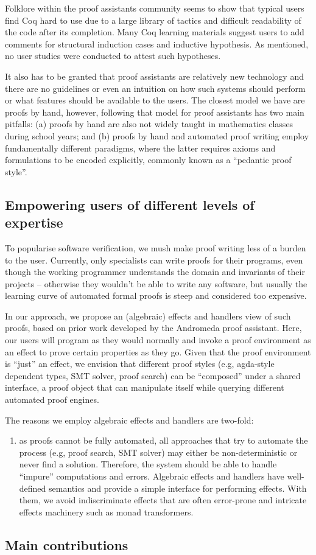 \documentclass[acmsmall]{acmart}
\begin{document}
Folklore within the proof assistants community seems to show that typical users
find Coq hard to use due to a large library of tactics and difficult readability
of the code after its completion. Many Coq learning materials suggest users to
add comments for structural induction cases and inductive hypothesis. As
mentioned, no user studies were conducted to attest such hypotheses.

It also has to be granted that proof assistants are relatively new technology
and there are no guidelines or even an intuition on how such systems should
perform or what features should be available to the users. The closest model we
have are proofs by hand, however, following that model for proof assistants has
two main pitfalls: (a) proofs by hand are also not widely taught in mathematics
classes during school years; and (b) proofs by hand and automated proof
writing employ fundamentally different paradigms, where the latter requires
axioms and formulations to be encoded explicitly, commonly known as a ``pedantic
proof style''.

\subsection{Empowering users of different levels of expertise}

To popularise software verification, we mush make proof writing less of a
burden to the user. Currently, only specialists can write proofs for their
programs, even though the working programmer understands the domain and
invariants of their projects -- otherwise they wouldn’t be able to write any
software, but usually the learning curve of automated formal proofs is steep
and considered too expensive.

In our approach, we propose an (algebraic) effects and handlers view of such
proofs, based on prior work developed by the Andromeda proof assistant. Here,
our users will program as they would normally and invoke
a proof environment as an effect to prove certain properties as they go. Given
that the proof environment is ``just'' an effect, we envision that different proof
styles (e.g, agda-style dependent types, SMT solver, proof search) can be ``composed''
under a shared interface, a proof object that can manipulate itself while
querying different automated proof engines.

The reasons we employ algebraic effects and handlers are two-fold:
\begin{enumerate}
\item as proofs cannot be fully automated, all approaches that try to automate
  the process (e.g, proof search, SMT solver) may either be non-deterministic or
  never find a solution. Therefore, the system should be able to handle
  ``impure'' computations and errors. Algebraic effects and handlers have
  well-defined semantics and provide a simple interface for performing effects.
  With them, we avoid indiscriminate effects that are often error-prone and
  intricate effects machinery such as monad transformers.
\end{enumerate}

\subsection{Main contributions}
\end{document}
